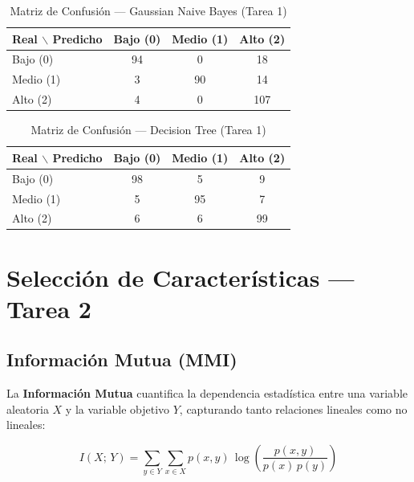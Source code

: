 \documentclass[12pt, letterpaper]{article}
\begin{document}
\begin{table}[H]
    \centering
    \caption{Matriz de Confusión — Gaussian Naive Bayes (Tarea 1)}
    \label{tab:cm_gnb}
    \begin{tabular}{lccc}
        \toprule
        \textbf{Real $\backslash$ Predicho} & \textbf{Bajo (0)} &
        \textbf{Medio (1)} & \textbf{Alto (2)} \\
        \midrule
        \rowcolor{rowgray} Bajo (0)  &  94 &  0 & 18 \\
                           Medio (1) &   3 & 90 & 14 \\
        \rowcolor{rowgray} Alto (2)  &   4 &  0 & 107 \\
        \bottomrule
    \end{tabular}
\end{table}

\begin{table}[H]
    \centering
    \caption{Matriz de Confusión — Decision Tree (Tarea 1)}
    \label{tab:cm_dt}
    \begin{tabular}{lccc}
        \toprule
        \textbf{Real $\backslash$ Predicho} & \textbf{Bajo (0)} &
        \textbf{Medio (1)} & \textbf{Alto (2)} \\
        \midrule
        \rowcolor{rowgray} Bajo (0)  & 98 &  5 &  9 \\
                           Medio (1) &  5 & 95 &  7 \\
        \rowcolor{rowgray} Alto (2)  &  6 &  6 & 99 \\
        \bottomrule
    \end{tabular}
\end{table}

\section{Selección de Características — Tarea 2}

\subsection{Información Mutua (MMI)}

La \textbf{Información Mutua} cuantifica la dependencia estadística entre
una variable aleatoria $X$ y la variable objetivo $Y$, capturando tanto
relaciones lineales como no lineales:

\begin{equation}
    I(X;\,Y) = \sum_{y \in Y}\sum_{x \in X}
    p(x,y)\,\log\!\left(\frac{p(x,y)}{p(x)\,p(y)}\right)
\end{equation}
\end{document}
